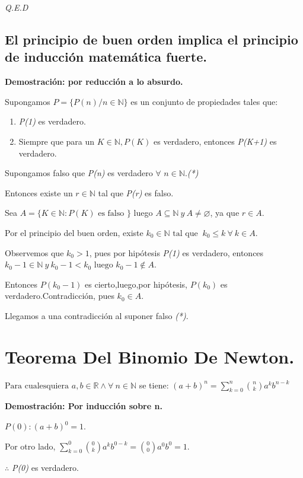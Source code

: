\documentclass{book}
\begin{document}
\textit{Q.E.D}

\subsection{El principio de buen orden implica el principio de inducción matemática fuerte.}

\textbf{Demostración: por reducción a lo absurdo.}

Supongamos $P=\lbrace P(n)/n\in{\mathbb{N}}\rbrace$ es un conjunto de propiedades tales que:
\begin{enumerate}[1.]
\item \textit{P(1)} es verdadero.
\item Siempre que para un $K\in{\mathbb{N}},P(K)$ es verdadero, entonces \textit{P(K+1)} es verdadero.
\end{enumerate}
Supongamos falso que \textit{P(n)} es verdadero $\forall$ $n\in{\mathbb{N}}$.\textit{(*)}

Entonces existe un $r\in{\mathbb{N}}$ tal que \textit{P(r)} es falso.

Sea $A=\lbrace K\in{\mathbb{N}}:P(K)\mbox{ es falso }\rbrace$ luego $A\subseteq{\mathbb{N}} \ y \ A\neq{\varnothing}$, ya que $r\in{A}$.

Por el principio del buen orden, existe $k_{0}\in{\mathbb{N}}\mbox{ tal que } \ k_{0}\le{k} \ \forall \ k\in{A}$.

Observemos que $k_{0}>1$, pues por hipótesis \textit{P(1)} es verdadero, entonces $k_{0}-1\in{\mathbb{N}} \ y \ k_{0}-1<k_{0}\mbox{ luego }k_{0}-1\not\in{A}$.

Entonces $P(k_{0}-1)$ es cierto,luego,por hipótesis, $P(k_{0})$ es verdadero.Contradicción, pues $k_{0}\in{A}$.

Llegamos a una contradicción al suponer falso \textit{(*)}.
  
\section{Teorema Del Binomio De Newton.}
$\mbox{Para cualesquiera }a,b\in{\mathbb{R}}\land \forall \ n\in{\mathbb{N}}$ se tiene:
$(a+b)^n=\sum_{k=0}^n \binom{n}{k} a^kb^{n-k}$

\textbf{Demostración: Por inducción sobre n.}

$P(0):(a+b)^0=1$.

Por otro lado, $\sum_{k=0}^0 \binom{0}{k} a^kb^{0-k}=\binom{0}{0}a^0b^0=1$.

$\therefore$ \textit{P(0)} es verdadero.
\end{document}
